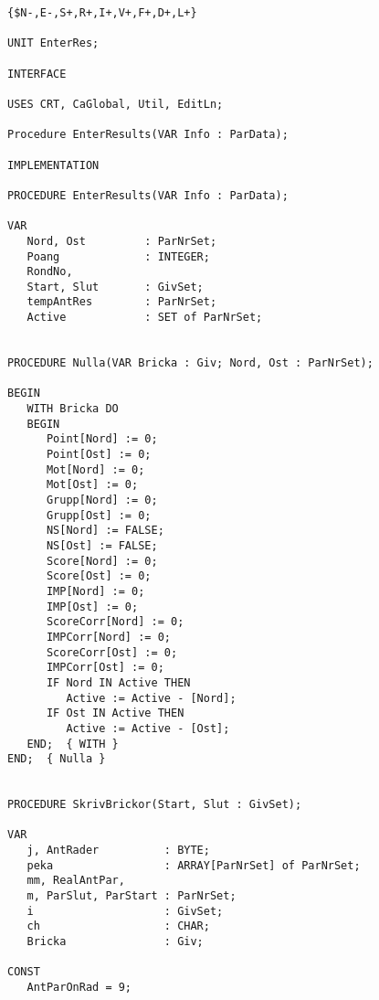 

\begin{verbatim}
{$N-,E-,S+,R+,I+,V+,F+,D+,L+}

UNIT EnterRes;

INTERFACE

USES CRT, CaGlobal, Util, EditLn;

Procedure EnterResults(VAR Info : ParData);

IMPLEMENTATION

PROCEDURE EnterResults(VAR Info : ParData);

VAR
   Nord, Ost         : ParNrSet;
   Poang             : INTEGER;
   RondNo,
   Start, Slut       : GivSet;
   tempAntRes        : ParNrSet;
   Active            : SET of ParNrSet;


PROCEDURE Nulla(VAR Bricka : Giv; Nord, Ost : ParNrSet);

BEGIN
   WITH Bricka DO
   BEGIN
      Point[Nord] := 0;
      Point[Ost] := 0;
      Mot[Nord] := 0;
      Mot[Ost] := 0;
      Grupp[Nord] := 0;
      Grupp[Ost] := 0;
      NS[Nord] := FALSE;
      NS[Ost] := FALSE;
      Score[Nord] := 0;
      Score[Ost] := 0;
      IMP[Nord] := 0;
      IMP[Ost] := 0;
      ScoreCorr[Nord] := 0;
      IMPCorr[Nord] := 0;
      ScoreCorr[Ost] := 0;
      IMPCorr[Ost] := 0;
      IF Nord IN Active THEN
         Active := Active - [Nord];
      IF Ost IN Active THEN
         Active := Active - [Ost];
   END;  { WITH }
END;  { Nulla }


PROCEDURE SkrivBrickor(Start, Slut : GivSet);

VAR
   j, AntRader          : BYTE;
   peka                 : ARRAY[ParNrSet] of ParNrSet;
   mm, RealAntPar,
   m, ParSlut, ParStart : ParNrSet;
   i                    : GivSet;
   ch                   : CHAR;
   Bricka               : Giv;

CONST
   AntParOnRad = 9;


\end{verbatim}
